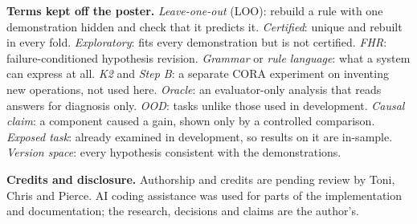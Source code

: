 \documentclass[11pt, a4paper]{article}
\begin{document}
\textbf{Terms kept off the poster.} \emph{Leave-one-out} (LOO): rebuild a rule with one demonstration hidden and check that it
predicts it. \emph{Certified}: unique and rebuilt in every fold. \emph{Exploratory}: fits every demonstration but is not certified.
\emph{FHR}: failure-conditioned hypothesis revision. \emph{Grammar} or \emph{rule language}: what a system can express at all. \emph{K2} and
\emph{Step B}: a separate CORA experiment on inventing new operations, not used here. \emph{Oracle}: an evaluator-only analysis
that reads answers for diagnosis only. \emph{OOD}: tasks unlike those used in development. \emph{Causal claim}: a component caused
a gain, shown only by a controlled comparison. \emph{Exposed task}: already examined in development, so results on it are
in-sample. \emph{Version space}: every hypothesis consistent with the demonstrations.

\textbf{Credits and disclosure.} Authorship and credits are pending review by Toni, Chris and Pierce. AI coding assistance was
used for parts of the implementation and documentation; the research, decisions and claims are the author's.
\end{document}
